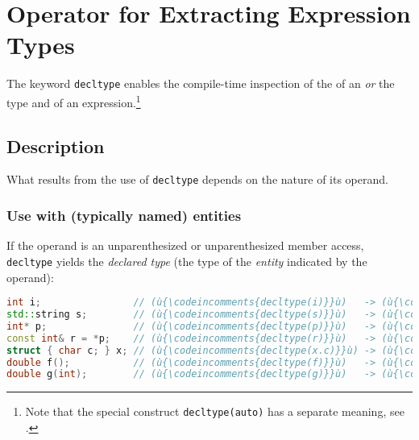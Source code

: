 \newpage
\section[\tt{decltype}]{Operator for Extracting Expression Types}\label{decltype}


The keyword \lstinline!decltype! enables the compile-time inspection of the  of an  \emph{or} the type and
 of an expression.\footnote{Note that the special construct \lstinline!decltype(auto)! has a separate meaning, see .}

\subsection[Description]{Description}\label{description}

What results from the use of \lstinline!decltype! depends on the nature of
its operand.

\subsubsection[Use with (typically named) entities]{Use with (typically named) entities}\label{use-with-(typically-named)-entities}

If the operand is an unparenthesized  or unparenthesized member access, \lstinline!decltype! yields the \emph{declared type} (the type of the \emph{entity} indicated by the operand):


\begin{lstlisting}[language=C++]
int i;                // (ù{\codeincomments{decltype(i)}}ù)   -> (ù{\codeincomments{int}}ù)
std::string s;        // (ù{\codeincomments{decltype(s)}}ù)   -> (ù{\codeincomments{std::string}}ù)
int* p;               // (ù{\codeincomments{decltype(p)}}ù)   -> (ù{\codeincomments{int}}ù)*
const int& r = *p;    // (ù{\codeincomments{decltype(r)}}ù)   -> (ù{\codeincomments{const int\&}}ù)
struct { char c; } x; // (ù{\codeincomments{decltype(x.c)}}ù) -> (ù{\codeincomments{char}}ù)
double f();           // (ù{\codeincomments{decltype(f)}}ù)   -> (ù{\codeincomments{double()}}ù)
double g(int);        // (ù{\codeincomments{decltype(g)}}ù)   -> (ù{\codeincomments{double(int)}}ù)
\end{lstlisting}


